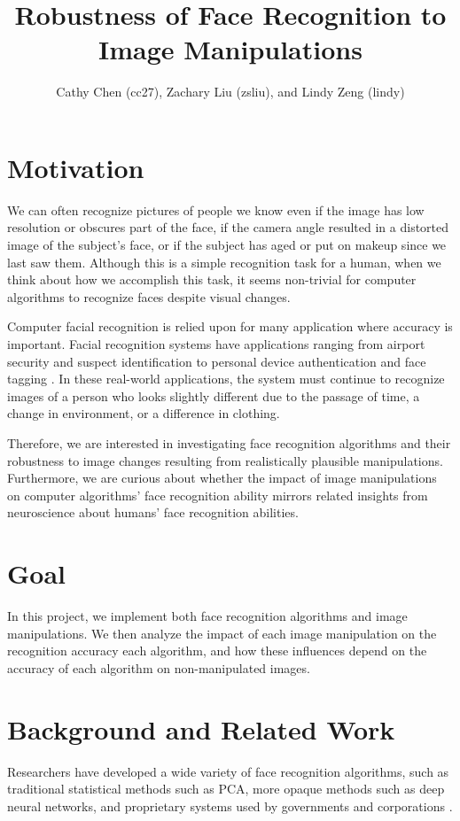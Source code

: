 \documentclass[pageno]{cos429}
\begin{document}
\title{Robustness of Face Recognition to Image Manipulations}

\author{Cathy Chen (cc27), Zachary Liu (zsliu), and Lindy Zeng (lindy)}
\date{}
\maketitle

\section{Motivation}
We can often recognize pictures of people we know even if the image has low resolution or obscures part of the face, if the camera angle resulted in a distorted image of the subject's face, or if the subject has aged or put on makeup since we last saw them. Although this is a simple recognition task for a human, when we think about how we accomplish this task, it seems non-trivial for computer algorithms to recognize faces despite visual changes.

Computer facial recognition is relied upon for many application where accuracy is important. Facial recognition systems have applications ranging from airport security and suspect identification to personal device authentication and face tagging \cite{huang_face_2011}. In these real-world applications, the system must continue to recognize images of a person who looks slightly different due to the passage of time, a change in environment, or a difference in clothing.

Therefore, we are interested in investigating face recognition algorithms and their robustness to image changes resulting from realistically plausible manipulations. Furthermore, we are curious about whether the impact of image manipulations on computer algorithms' face recognition ability mirrors related insights from neuroscience about humans' face recognition abilities.

\section{Goal}
In this project, we implement both face recognition algorithms and image manipulations. We then analyze the impact of each image manipulation on the recognition accuracy each algorithm, and how these influences depend on the accuracy of each algorithm on non-manipulated images.

\section{Background and Related Work}
Researchers have developed a wide variety of face recognition algorithms, such as traditional statistical methods such as PCA, more opaque methods such as deep neural networks, and proprietary systems used by governments and corporations \cite{noauthor_face_nodate}\cite{schroff_facenet:_2015}\cite{sun_meet_2017}.
\end{document}
